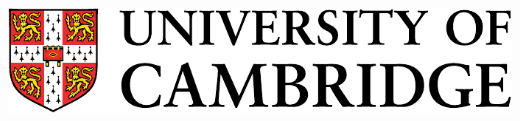\documentclass[landscape,a0b,final,a4resizeable]{include/a0poster}
\begin{document}
\begin{poster}
\begin{center}
\begin{pcolumn}{0.99}
{\begin{minipage}[c][9cm][c]{0.76\textwidth}
\begin{center}
{    %
    }
  \end{center}
\end{minipage}
%
%
\begin{minipage}[c]{\logowidth}
  \begin{flushright}
    \includegraphics[width=15cm, clip]{badges/camtext}
  \end{flushright}
\end{minipage}
%
}
\end{pcolumn}
\end{center}

\vspace*{3cm}

\Large




\begin{multicols}{3}




\end{multicols}
\end{poster}
\end{document}
